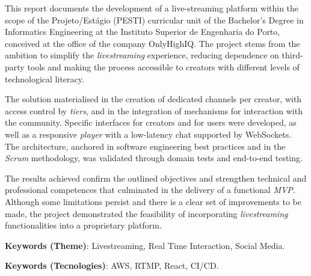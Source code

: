 \begin{abstractotherlanguage}

This report documents the development of a live-streaming platform within the scope of the Projeto/Estágio (PESTI) curricular unit of the Bachelor's Degree in Informatics Engineering at the Instituto Superior de Engenharia do Porto, conceived at the office of the company OnlyHighIQ. The project stems from the ambition to simplify the \textit{livestreaming} experience, reducing dependence on third-party tools and making the process accessible to creators with different levels of technological literacy.

The solution materialised in the creation of dedicated channels per creator, with access control by \textit{tiers}, and in the integration of mechanisms for interaction with the community. Specific interfaces for creators and for users were developed, as well as a responsive \textit{player} with a low-latency chat supported by WebSockets. The architecture, anchored in software engineering best practices and in the \textit{Scrum} methodology, was validated through domain tests and end-to-end testing.

The results achieved confirm the outlined objectives and strengthen technical and professional competences that culminated in the delivery of a functional \textit{MVP}. Although some limitations persist and there is a clear set of improvements to be made, the project demonstrated the feasibility of incorporating \textit{livestreaming} functionalities into a proprietary platform.

\vspace{20mm}

\textbf{Keywords (Theme)}:	Livestreaming, Real Time Interaction, Social Media.

\textbf{Keywords (Tecnologies)}: 	AWS, RTMP, React, CI/CD.

\end{abstractotherlanguage}


